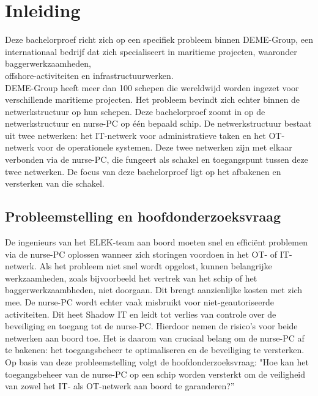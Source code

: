 


% 

\section{Inleiding}%
\label{sec:inleiding}
Deze bachelorproef richt zich op een specifiek probleem binnen DEME-Group, een internationaal bedrijf dat zich specialiseert in maritieme projecten, waaronder 
baggerwerkzaamheden, \\offshore-activiteiten en infrastructuurwerken. \\DEME-Group heeft meer dan 100 schepen die wereldwijd worden ingezet voor verschillende maritieme projecten. Het probleem 
bevindt zich echter binnen de netwerkstructuur op hun schepen. Deze bachelorproef zoomt in op de netwerkstructuur en nurse-PC op één bepaald schip. De netwerkstructuur bestaat uit twee netwerken: het IT-netwerk voor administratieve taken 
en het OT-netwerk voor de operationele systemen. Deze twee netwerken zijn met elkaar verbonden via de nurse-PC, 
die fungeert als schakel en toegangspunt tussen deze twee netwerken. De focus van deze bachelorproef ligt op het afbakenen en versterken van die schakel.

\subsection{Probleemstelling en hoofdonderzoeksvraag}
De ingenieurs van het ELEK-team aan boord moeten snel en efficiënt problemen via de nurse-PC oplossen wanneer zich storingen voordoen in het OT- of  IT-netwerk.  
Als het probleem niet snel wordt opgelost, kunnen belangrijke werkzaamheden, zoals bijvoorbeeld het vertrek van het schip of het baggerwerkzaambheden, niet doorgaan. 
Dit brengt aanzienlijke kosten met zich mee. De nurse-PC wordt echter vaak misbruikt voor niet-geautoriseerde activiteiten. Dit heet Shadow IT en leidt tot verlies van controle 
over de beveiliging en toegang tot de nurse-PC. Hierdoor nemen de risico’s voor beide netwerken aan boord toe. Het is daarom van cruciaal belang om de nurse-PC af 
te bakenen: het toegangsbeheer te optimaliseren en de beveiliging te versterken. Op basis van deze probleemstelling volgt de hoofdonderzoeksvraag: 
"Hoe kan het toegangsbeheer van de nurse-PC op een schip worden versterkt om de veiligheid van zowel het IT- als OT-netwerk aan boord te garanderen?” 

